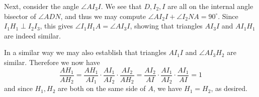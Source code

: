 \documentclass[11pt,a4paper]{article}
\begin{document}
\begin{enumerate}
    	Next, consider the angle $\angle AI_3I$. 
    	We see that $D, I_2, I$ are all on the internal angle bisector of $\angle ADN$, 
    	and thus we may compute $\angle AI_2I + \angle I_2NA=90^{\circ}$. 
    	Since $I_1H_1\perp I_2I_3$, 
    	this gives $\angle I_1H_1A = \angle AI_3I$, 
    	showing that triangles $AI_3I$ and $AI_1H_1$ are indeed similar. 
    	
    	In a similar way we may also establish that triangles $AI_1I$ and $\angle AI_3H_2$ are similar. 
    	Therefore we now have 
    	\[
    	\frac{AH_1}{AH_2}
    	=\frac{AH_1}{AI_1}\cdot \frac{AI_1}{AI_2}\cdot \frac{AI_2}{AH_2}
    	=\frac{AI_2}{AI}\cdot \frac{AI_1}{AI_2}\cdot \frac{AI_1}{AI}
    	=1
    	\]
    	and since $H_1, H_2$ are both on the same side of $A$, we have $H_1=H_2$, as desired. 
    	
    \end{enumerate}
    
\end{document}
